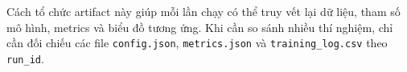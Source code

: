 Cách tổ chức artifact này giúp mỗi lần chạy có thể truy vết lại dữ liệu, tham số mô hình, metrics và biểu đồ tương ứng. Khi cần so sánh nhiều thí nghiệm, chỉ cần đối chiếu các file \texttt{config.json}, \texttt{metrics.json} và \texttt{training\_log.csv} theo \texttt{run\_id}.

\begingroup
\newcommand{\AlgoBlock}[1]{\textcolor{HeadingTwoColor}{--- #1 ---}}
\newcommand{\AlgoComment}[1]{\textcolor{HeadingThreeColor}{\# #1}}

